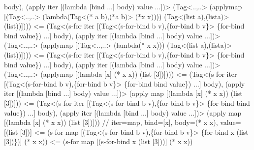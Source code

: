 \begin{Codes}
           body),
         (apply iter [(lambda [bind ...] body) value ...])>
      (Tag<..,..> (apply\C map [(Tag<..,..> (lambda\C [x]
           (Tag<(* a b),(*\C a b)> (*\C x x))))
        (Tag<(list a),(list\C a)> (list\C [3]))])))
<= (Tag<(s-for iter
         [(Tag<(s-for-bind b v),\{for-bind b v\}>
             \{for-bind bind value\}) ...]
           body),
         (apply iter [(lambda [bind ...] body) value ...])>
      (Tag<..,..> (apply\C map [(Tag<..,..> (lambda\C [x] (* x x)))
        (Tag<(list a),(list\C a)> (list\C [3]))])))
<= (Tag<(s-for iter
         [(Tag<(s-for-bind b v),\{for-bind b v\}>
             \{for-bind bind value\}) ...]
           body),
         (apply iter [(lambda [bind ...] body) value ...])>
      (Tag<..,..> (apply\C map [(lambda [x] (* x x))
        (list [3])])))
<= (Tag<(s-for iter
         [(Tag<(s-for-bind b v),\{for-bind b v\}>
             \{for-bind bind value\}) ...]
           body),
         (apply iter [(lambda [bind ...] body) value ...])>
      (apply map [(lambda [x] (* x x)) (list [3])]))
<= (Tag<(s-for iter
         [(Tag<(s-for-bind b v),\{for-bind b v\}>
             \{for-bind bind value\}) ...]
           body),
         (apply iter [(lambda [bind ...] body) value ...])>
      (apply map [(lambda [x] (* x x)) (list [3])]))
  // iter=map, bind=[x], body=(* x x), value=[(list [3])]
<= (s-for map
     [(Tag<(s-for-bind b v),\{for-bind b v\}>
        \{for-bind x (list [3])\})]
     (* x x))
<= (s-for map
     [(s-for-bind x (list [3]))]
     (* x x))
\end{Codes}


